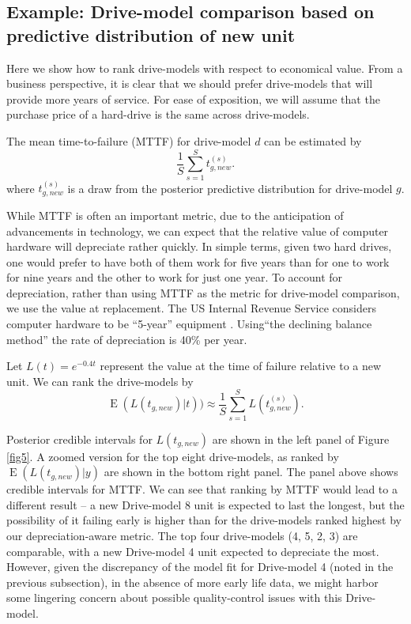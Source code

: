 \documentclass[11pt]{article}
\newcommand{\op}{\operatorname}
\begin{document}
\subsection{Example: Drive-model comparison based on predictive distribution of new unit}

Here we show how to rank drive-models with respect to economical value. From a
business perspective, it is clear
that we should prefer drive-models that will provide more years
of service. For ease of exposition, we will assume that the purchase
price of a hard-drive is the same across drive-models.

The mean time-to-failure (MTTF) for drive-model $d$ can be estimated by
$$\frac{1}{S} \sum_{s=1}^{S} t_{g,new}^{(s)}.$$
where $t_{g,new}^{(s)}$ is a draw from the posterior predictive distribution for drive-model $g$. 

While MTTF is often an important metric, due to the
anticipation of advancements in technology, we can expect that the
relative value of computer hardware will depreciate rather quickly. In simple terms, given two hard drives, one would prefer to have both of them work for five years than for one to work for nine years and the other to work for just one year. To account
for depreciation, rather than using MTTF as the metric for drive-model comparison, we use the value at replacement. The US Internal Revenue Service considers
computer hardware to be ``5-year'' equipment \citep{f4562}. Using``the declining
balance method'' the rate of depreciation is 40\% per year.

Let $L(t) = e^{-0.4t}$ represent the value at the time of failure
relative to a new unit. We can rank the drive-models by 
$$\op{E}(L(t_{g,new})|t))\approx \frac{1}{S} \sum_{s=1}^{S} L(t_{g,new}^{(s)}).$$

Posterior credible intervals for $L(t_{g,new})$ are shown in the left panel of Figure \ref{fig5}. A zoomed version for the top eight drive-models, as ranked by $\op{E}(L(t_{g,new})|y)$ are shown in the bottom right panel. The panel above shows credible intervals for MTTF. We can see that ranking by MTTF would lead to a different result -- a new Drive-model 8 unit is expected to last the longest, but the possibility of it failing early is higher than for the drive-models ranked highest by our depreciation-aware metric. The top four drive-models (4, 5, 2, 3) are comparable, with a new Drive-model 4 unit expected to depreciate the most. However, given the discrepancy of the model fit for Drive-model 4 (noted in the previous subsection), in the absence of more early life data, we might harbor some lingering concern about possible quality-control issues with this Drive-model.
\end{document}
